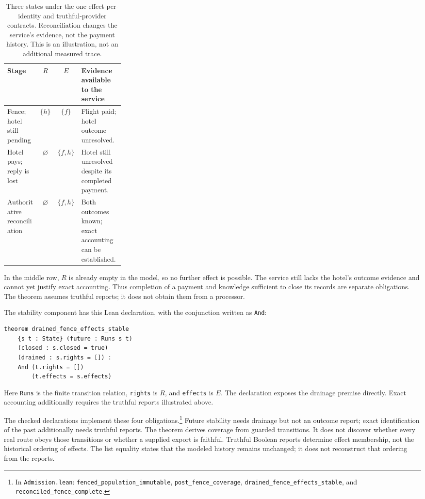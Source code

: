 \documentclass[11pt]{article}
\newcommand{\code}[1]{\texttt{\small #1}}
\begin{document}
\begin{table}[ht]
\centering\small
\begin{tabularx}{\linewidth}{@{}>{\raggedright\arraybackslash}p{0.28\linewidth} c c >{\raggedright\arraybackslash}X@{}}
\toprule
Stage & $R$ & $E$ & Evidence available to the service \\
\midrule
Fence; hotel still pending & $\{h\}$ & $\{f\}$ & Flight paid; hotel outcome unresolved. \\
Hotel pays; reply is lost & $\varnothing$ & $\{f,h\}$ & Hotel still unresolved despite its completed payment. \\
Authoritative reconciliation & $\varnothing$ & $\{f,h\}$ & Both outcomes known; exact accounting can be established. \\
\bottomrule
\end{tabularx}
\caption{Three states under the one-effect-per-identity and truthful-provider
contracts. Reconciliation changes the service's evidence, not the payment
history. This is an illustration, not an additional measured trace.}
\label{tab:theorem_states}
\end{table}

In the middle row, $R$ is already empty in the model, so no further effect is
possible. The service still lacks the hotel's outcome evidence and cannot yet
justify exact accounting. Thus completion of a payment and knowledge sufficient
to close its records are separate obligations. The theorem assumes truthful
reports; it does not obtain them from a processor.

The stability component has this Lean declaration, with the conjunction
written as \code{And}:
\begin{verbatim}
theorem drained_fence_effects_stable
    {s t : State} (future : Runs s t)
    (closed : s.closed = true)
    (drained : s.rights = []) :
    And (t.rights = [])
        (t.effects = s.effects)
\end{verbatim}
Here \code{Runs} is the finite transition relation, \code{rights} is $R$, and
\code{effects} is $E$. The declaration exposes the drainage premise directly.
Exact accounting additionally requires the truthful reports illustrated above.

The checked declarations implement these four obligations.\footnote{\raggedright In
\code{Admission.lean}: \code{fenced\_population\_immutable},
\code{post\_fence\_coverage}, \code{drained\_fence\_effects\_stable}, and
\code{reconciled\_fence\_complete}.\par}
Future stability needs drainage but not an outcome report; exact identification
of the past additionally needs truthful reports. The theorem derives coverage
from guarded transitions. It does not discover whether every real route obeys
those transitions or whether a supplied export is faithful.
Truthful Boolean reports determine effect membership, not the historical
ordering of effects. The list equality states that the modeled history remains
unchanged; it does not reconstruct that ordering from the reports.
\end{document}
